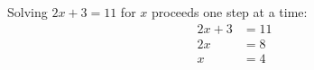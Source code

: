 \documentclass{article}
\begin{document}
Solving $2x + 3 = 11$ for $x$ proceeds one step at a time:
\begin{align}
  2x + 3 &= 11 \\
  2x     &= 8  \\
  x      &= 4
\end{align}
\end{document}
